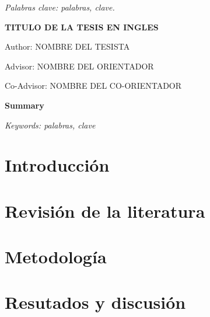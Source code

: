 \documentclass[12pt,oneside,a4paper]{report}
\renewcommand{\footrulewidth}{0.5pt}
\begin{document}
\noindent 

\textit{Palabras clave: palabras, clave.}

\newpage
\thispagestyle{plain}
\begin{center}
\large{\textbf{TITULO DE LA TESIS EN INGLES}}\\
\end{center}

\normalsize{

\hfill Author: NOMBRE DEL TESISTA

\hfill Advisor: NOMBRE DEL ORIENTADOR

\hfill Co-Advisor: NOMBRE DEL CO-ORIENTADOR

\textbf{Summary}




\textit{Keywords: palabras, clave}

\newpage

\lhead{}
\rhead{\thepage}

\tableofcontents

\pagebreak

\listoffigures

\pagebreak

\listoftables













\pagebreak
{}
\chead{} 
\rhead{\thepage} 
\cfoot{}
\renewcommand{\footrulewidth}{0.5pt}


\chapter{Introducci\'on}





 
\chapter{Revisi\'on de la literatura}


\chapter{Metodolog\'ia}


\chapter{Resutados y discusión}


}
\end{document}
